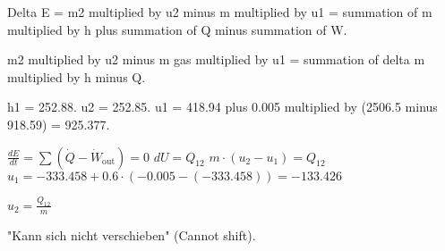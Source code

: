Delta E = m2 multiplied by u2 minus m multiplied by u1 = summation of m multiplied by h plus summation of Q minus summation of W.  

m2 multiplied by u2 minus m gas multiplied by u1 = summation of delta m multiplied by h minus Q.  

h1 = 252.88.  
u2 = 252.85.  
u1 = 418.94 plus 0.005 multiplied by (2506.5 minus 918.59) = 925.377.

\( \frac{dE}{dt} = \sum (\dot{Q} - \dot{W}_{\text{out}}) = 0 \)  
\( dU = Q_{12} \)  
\( m \cdot (u_2 - u_1) = Q_{12} \)  
\( u_1 = -333.458 + 0.6 \cdot (-0.005 - (-333.458)) = -133.426 \)  

\( u_2 = \frac{Q_{12}}{m} \)  

"Kann sich nicht verschieben" (Cannot shift).